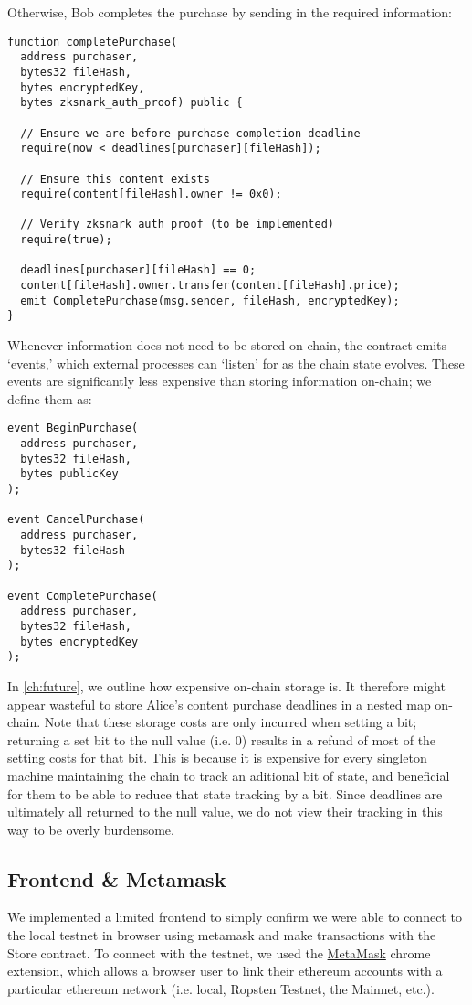 \documentclass[12pt,oneside]{amsart}
\makeatletter
\newcommand*\ie{i.e.\@\xspace}
\makeatother
\begin{document}
Otherwise, Bob completes the purchase by sending in the required information:

\begin{Verbatim}[fontsize=\tiny, frame=single]
function completePurchase(
  address purchaser,
  bytes32 fileHash,
  bytes encryptedKey,
  bytes zksnark_auth_proof) public {

  // Ensure we are before purchase completion deadline
  require(now < deadlines[purchaser][fileHash]);

  // Ensure this content exists
  require(content[fileHash].owner != 0x0);

  // Verify zksnark_auth_proof (to be implemented)
  require(true);

  deadlines[purchaser][fileHash] == 0;
  content[fileHash].owner.transfer(content[fileHash].price);
  emit CompletePurchase(msg.sender, fileHash, encryptedKey);
}
\end{Verbatim}

Whenever information does not need to be stored on-chain, the contract emits `events,' which external processes can `listen' for as the chain state evolves.
These events are significantly less expensive than storing information on-chain; we define them as:

\begin{Verbatim}[fontsize=\tiny, frame=single]
event BeginPurchase(
  address purchaser,
  bytes32 fileHash,
  bytes publicKey
);

event CancelPurchase(
  address purchaser,
  bytes32 fileHash
);

event CompletePurchase(
  address purchaser,
  bytes32 fileHash,
  bytes encryptedKey
);
\end{Verbatim}

In \ref{ch:future}, we outline how expensive on-chain storage is.
It therefore might appear wasteful to store Alice's content purchase deadlines in a nested map on-chain.
Note that these storage costs are only incurred when setting a bit; returning a set bit to the null value (\ie 0) results in a refund of most of the setting costs for that bit.
This is because it is expensive for every singleton machine maintaining the chain to track an aditional bit of state, and beneficial for them to be able to reduce that state tracking by a bit.
Since deadlines are ultimately all returned to the null value, we do not view their tracking in this way to be overly burdensome.

\subsection{Frontend \& Metamask}
We implemented a limited frontend to simply confirm we were able to connect to the local testnet in browser using metamask and make transactions with the Store contract.
To connect with the testnet, we used the \href{https://metamask.io/}{MetaMask} chrome extension, which allows a browser user to link their ethereum accounts with a particular ethereum network (\ie local, Ropsten Testnet, the Mainnet, etc.).
\end{document}
